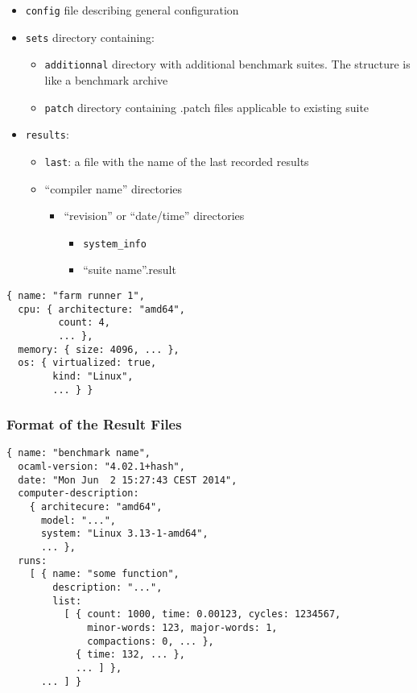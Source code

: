 \documentclass[11pt,a4paper]{article}
\begin{document}
\begin{itemize}
\item {\tt config} file describing general configuration
\item {\tt sets} directory containing:
  \begin{itemize}
  \item {\tt additionnal} directory with additional benchmark
    suites. The structure is like a benchmark archive
  \item {\tt patch} directory containing .patch files applicable to
    existing suite
  \end{itemize}
\item {\tt results}:
  \begin{itemize}
  \item {\tt last}: a file with the name of the last recorded results
  \item ``compiler name'' directories
    \begin{itemize}
    \item ``revision'' or ``date/time'' directories
      \begin{itemize}
      \item {\tt system\_info}
      \item ``suite name''.result
      \end{itemize}
    \end{itemize}
  \end{itemize}
\end{itemize}

\begin{verbatim}
{ name: "farm runner 1",
  cpu: { architecture: "amd64",
         count: 4,
         ... },
  memory: { size: 4096, ... },
  os: { virtualized: true,
        kind: "Linux",
        ... } }
\end{verbatim}

\subsubsection{Format of the Result Files}

\begin{verbatim}
{ name: "benchmark name",
  ocaml-version: "4.02.1+hash",
  date: "Mon Jun  2 15:27:43 CEST 2014",
  computer-description:
    { architecure: "amd64",
      model: "...",
      system: "Linux 3.13-1-amd64",
      ... },
  runs:
    [ { name: "some function",
        description: "...",
        list:
          [ { count: 1000, time: 0.00123, cycles: 1234567,
              minor-words: 123, major-words: 1,
              compactions: 0, ... },
            { time: 132, ... },
            ... ] },
      ... ] }
\end{verbatim}
\end{document}
